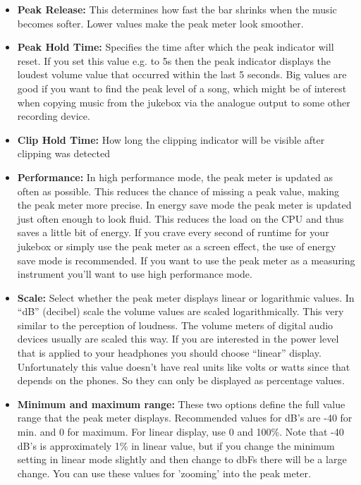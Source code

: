 \begin{itemize}
{    \begin{itemize}
    \item \textbf{Peak Release:}
      This determines how fast the bar shrinks when the music becomes softer. Lower values make the peak meter look smoother.
    \item \textbf{Peak Hold Time:} 
      Specifies the time after which the peak indicator will reset. If you set this value e.g. to 5s then the peak indicator displays the loudest volume value that occurred within the last 5 seconds. Big values are good if you want to find the peak level of a song, which might be of interest when copying music from the jukebox via the analogue output to some other recording device.
    \item \textbf{Clip Hold Time:}
      How long the clipping indicator will be visible after clipping was detected 
    \item \textbf{Performance:}
      In high performance mode, the peak meter is updated as often as possible. This reduces the chance of missing a peak value, making the peak meter more precise. In energy save mode the peak meter is updated just often enough to look fluid. This reduces the load on the CPU and thus saves a little bit of energy. If you crave every second of runtime for your jukebox or simply use the peak meter as a screen effect, the use of energy save mode is recommended. If you want to use the peak meter as a measuring instrument you'll want to use high performance mode.
    \item \textbf{Scale:}
      Select whether the peak meter displays linear or logarithmic values. In ``dB'' (decibel) scale the volume values are scaled logarithmically. This very similar to the perception of loudness. The volume meters of digital audio devices usually are scaled this way. If you are interested in the power level that is applied to your headphones you should choose ``linear'' display. Unfortunately this value doesn't have real units like volts or watts since that depends on the phones. So they can only be displayed as percentage values.
    \item \textbf{Minimum and maximum range:} 
      These two options define the full value range that the peak meter displays. Recommended values for dB's are {}-40 for min. and 0 for maximum. For linear display, use 0 and 100\%. Note that {}-40 dB's is approximately 1\% in linear value, but if you change the minimum setting in linear mode slightly and then change to dbFs there will be a large change. You can use these values for 'zooming' into the peak meter.
    \end{itemize}
  }
\end{itemize}

